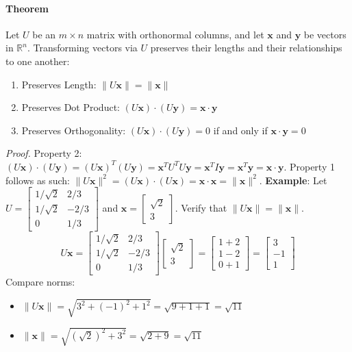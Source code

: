 \documentclass[../linear-algebra.tex]{subfiles}
\begin{document}
\paragraph{Theorem} Let $U$ be an $m \times n$ matrix with orthonormal columns, and let $\mathbf{x}$ and $\mathbf{y}$ be vectors in $\mathbb{R}^n$. Transforming vectors via $U$ preserves their lengths and their relationships to one another:
\begin{enumerate}
    \item Preserves Length: $\|U\mathbf{x}\| = \|\mathbf{x}\|$
    \item Preserves Dot Product: $(U\mathbf{x}) \cdot (U\mathbf{y}) = \mathbf{x} \cdot \mathbf{y}$
    \item Preserves Orthogonality: $(U\mathbf{x}) \cdot (U\mathbf{y}) = 0$ if and only if $\mathbf{x} \cdot \mathbf{y} = 0$
\end{enumerate}
\textit{Proof.} Property 2: $(U\mathbf{x}) \cdot (U\mathbf{y}) = (U\mathbf{x})^T (U\mathbf{y}) = \mathbf{x}^T U^T U \mathbf{y} = \mathbf{x}^T I \mathbf{y} = \mathbf{x}^T \mathbf{y} = \mathbf{x} \cdot \mathbf{y}$.\newline
Property 1 follows as such: $\|U\mathbf{x}\|^2 = (U\mathbf{x}) \cdot (U\mathbf{x}) = \mathbf{x} \cdot \mathbf{x} = \|\mathbf{x}\|^2$.\newline
\textbf{Example}: Let $U = \begin{bmatrix} 1/\sqrt{2} & 2/3 \\ 1/\sqrt{2} & -2/3 \\ 0 & 1/3 \end{bmatrix}$ and $\mathbf{x} = \begin{bmatrix} \sqrt{2} \\ 3 \end{bmatrix}$. Verify that $\|U\mathbf{x}\| = \|\mathbf{x}\|$.\newline
$$U\mathbf{x} = \begin{bmatrix} 1/\sqrt{2} & 2/3 \\ 1/\sqrt{2} & -2/3 \\ 0 & 1/3 \end{bmatrix} \begin{bmatrix} \sqrt{2} \\ 3 \end{bmatrix} = \begin{bmatrix} 1 + 2 \\ 1 - 2 \\ 0 + 1 \end{bmatrix} = \begin{bmatrix} 3 \\ -1 \\ 1 \end{bmatrix}$$
Compare norms:
\begin{itemize}
    \item $\|U\mathbf{x}\| = \sqrt{3^2 + (-1)^2 + 1^2} = \sqrt{9 + 1 + 1} = \sqrt{11}$
    \item $\|\mathbf{x}\| = \sqrt{(\sqrt{2})^2 + 3^2} = \sqrt{2 + 9} = \sqrt{11}$
\end{itemize}
\end{document}
